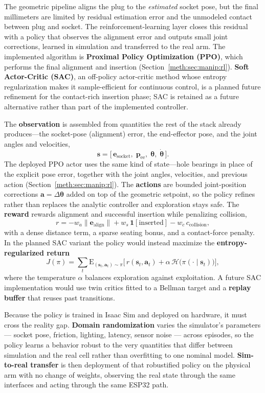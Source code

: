 The geometric pipeline aligns the plug to the \emph{estimated} socket pose, but the final millimeters are limited by residual estimation error and the unmodeled contact between plug and socket. The reinforcement-learning layer closes this residual with a policy that observes the alignment error and outputs small joint corrections, learned in simulation and transferred to the real arm. The implemented algorithm is \textbf{Proximal Policy Optimization (PPO)}, which performs the final alignment and insertion (Section~\ref{meth:sec:manip:rl}). \textbf{Soft Actor-Critic (SAC)}, an off-policy actor-critic method whose entropy regularization makes it sample-efficient for continuous control, is a planned future refinement for the contact-rich insertion phase; SAC is retained as a future alternative rather than part of the implemented controller.

The \textbf{observation} is assembled from quantities the rest of the stack already produces---the socket-pose (alignment) error, the end-effector pose, and the joint angles and velocities,
$$
\mathbf{s}=\big[\,\mathbf{e}_{\text{socket}},\;\mathbf{p}_{\text{ee}},\;\boldsymbol{\theta},\;\dot{\boldsymbol{\theta}}\,\big].
$$
The deployed PPO actor uses the same kind of state---hole bearings in place of the explicit pose error, together with the joint angles, velocities, and previous action (Section~\ref{meth:sec:manip:rl}). The \textbf{actions} are bounded joint-position corrections $\mathbf{a}=\Delta\boldsymbol{\theta}$ added on top of the geometric setpoint, so the policy refines rather than replaces the analytic controller and exploration stays safe. The \textbf{reward} rewards alignment and successful insertion while penalizing collision,
$$
r=-w_a\lVert \mathbf{e}_{\text{align}}\rVert + w_s\,\mathbf{1}[\text{inserted}] - w_c\,c_{\text{collision}},
$$
with a dense distance term, a sparse seating bonus, and a contact-force penalty. In the planned SAC variant the policy would instead maximize the \textbf{entropy-regularized return}
$$
J(\pi)=\sum_t \mathrm{E}_{(\mathbf{s}_t,\mathbf{a}_t)\sim\pi}\!\big[\,r(\mathbf{s}_t,\mathbf{a}_t)+\alpha\,\mathcal{H}\big(\pi(\cdot\mid\mathbf{s}_t)\big)\big],
$$
where the temperature $\alpha$ balances exploration against exploitation. A future SAC implementation would use twin critics fitted to a Bellman target and a \textbf{replay buffer} that reuses past transitions.

Because the policy is trained in Isaac Sim and deployed on hardware, it must cross the reality gap. \textbf{Domain randomization} varies the simulator's parameters --- socket pose, friction, lighting, latency, sensor noise --- across episodes, so the policy learns a behavior robust to the very quantities that differ between simulation and the real cell rather than overfitting to one nominal model. \textbf{Sim-to-real transfer} is then deployment of that robustified policy on the physical arm with no change of weights, observing the real state through the same interfaces and acting through the same ESP32 path.

